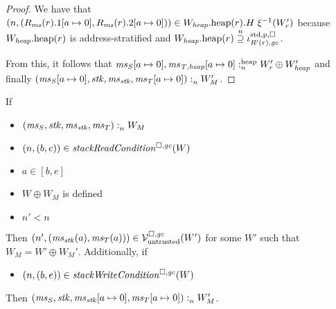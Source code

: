 \begin{proof}
  We have that $\npair{(R_\ms(r).1\update{a}{0},R_\ms(r).2\update{a}{0})} \in \pwheap[W_\var{heap}](r).H \; \xi^{-1}(W_r')$ because $\pwheap[W_\var{heap}](r)$ is address-stratified and $\pwheap[W_\var{heap}](r) \nsupeq \stdreg{R'(r),\gc}{\pur}$.

  From this, it follows that $\memSatHeap{\ms_S\update{a}{0},\ms_\var{T,heap}\update{a}{0}}{W_r' \oplus W_\var{heap}'}$ and finally $\memSat{(\ms_S\update{a}{0},\stk,\ms_\stk,\ms_T\update{a}{0})}{W_M'}$.
\end{proof}

\begin{lemma}
  \label{lem:stackreadcond-stackwritecond-work}
  If
  \begin{itemize}
  \item $\memSat{(\ms_S,\stk,\ms_\stk,\ms_T)}{W_M}$
  \item $\npair{(b,e)}\in\stackReadCond{W}$
  \item $a \in [b,e]$
  \item $W \oplus W_M$ is defined
  \item $n' < n$
  \end{itemize}
  Then $\npair[n']{(\ms_\stk(a),\ms_T(a))} \in \lrv(W')$ for some $W'$ such that $W_M = W' \oplus W_M'$.
  Additionally, if
  \begin{itemize}
  \item $\npair{(b,e)}\in\stackWriteCond{W}$
  \end{itemize}
  Then $\memSat{(\ms_S,\stk,\ms_\stk[a\mapsto 0],\ms_T[a\mapsto 0])}{W_M'}$.
\end{lemma}
